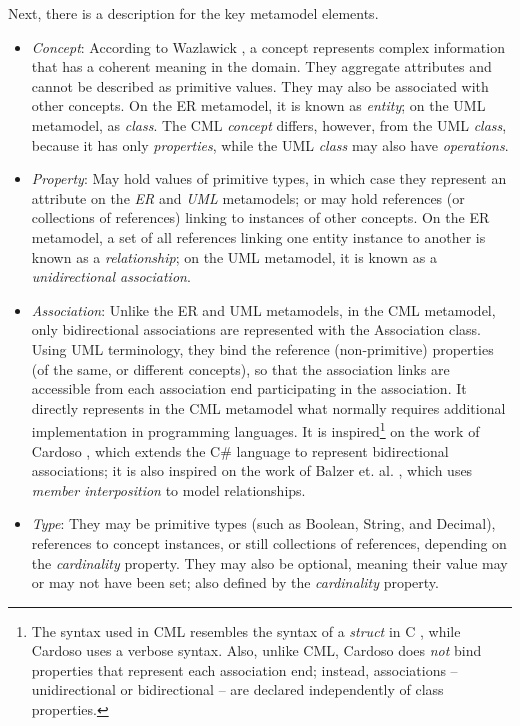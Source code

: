 Next, there is a description for the key metamodel elements.

\begin{itemize}

\item \emph{Concept}: According to Wazlawick \cite{wazlawick},
a concept represents complex information that has a coherent meaning in the domain.
They aggregate attributes and cannot be described as primitive values.
They may also be associated with other concepts.
On the ER metamodel, it is known as \emph{entity};
on the UML metamodel, as \emph{class}.
The CML \emph{concept} differs, however, from the UML \emph{class},
because it has only \emph{properties},
while the UML \emph{class} may also have \emph{operations}.

\item \emph{Property}: May hold values of primitive types, in which case they represent an attribute on the \emph{ER} and \emph{UML} metamodels;
or may hold references (or collections of references) linking to instances of other concepts.
On the ER metamodel,
a set of all references linking one entity instance to another is known as a \emph{relationship};
on the UML metamodel, it is known as a \emph{unidirectional association}.

\item \emph{Association}: Unlike the ER and UML metamodels, in the CML metamodel, only bidirectional associations are represented with the Association class. Using UML terminology, they bind the reference (non-primitive) properties (of the same, or different concepts),
so that the association links are accessible from each association end participating in the association.
It directly represents in the CML metamodel what normally requires additional implementation in programming languages.
It is inspired\footnote{The syntax used in CML resembles the syntax of a \emph{struct} in C \cite{clang}, while Cardoso \cite{cardoso} uses a verbose syntax. Also, unlike CML, Cardoso does \emph{not} bind properties that represent each association end; instead, associations -- unidirectional or bidirectional -- are declared independently of class properties.} on the work of Cardoso \cite{cardoso}, which extends the C\# language to represent bidirectional associations; it is also inspired on the work of Balzer et. al. \cite{balzer}, which uses \emph{member interposition} to model relationships.

\item \emph{Type}: They may be primitive types (such as Boolean, String, and Decimal), references to concept instances, or still collections of references, depending on the \emph{cardinality} property. They may also be optional, meaning their value may or may not have been set; also defined by the \emph{cardinality} property.

\end{itemize}
